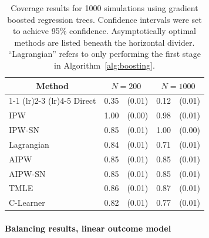 \begin{table}[H]
\centering
\small
\begin{tabular}{lrrrr}
\toprule
 \multicolumn{1}{c}{Method} & \multicolumn{2}{c}{$N=200$} & \multicolumn{2}{c}{$N=1000$} \\
 \cmidrule(lr){1-1}
\cmidrule(lr){2-3}
\cmidrule(lr){4-5}
  Direct & 0.35 & (0.01) & 0.12 & (0.01) \\ 
  IPW & 1.00 & (0.00) & 0.98 & (0.01) \\ 
  IPW-SN & 0.85 & (0.01) & 1.00 & (0.00) \\ 
Lagrangian & 0.84 & (0.01) & 0.71 & (0.01) \\ 
  \greymidrule
  AIPW & 0.85 & (0.01) & 0.85 & (0.01) \\ 
  AIPW-SN & 0.85 & (0.01) & 0.85 & (0.01) \\  
  TMLE & 0.86 & (0.01) & 0.87 & (0.01) \\ 
  C-Learner & 0.82 & (0.01) & 0.77 & (0.01) \\ 
\bottomrule
\end{tabular}
\caption{Coverage results for 1000 simulations using gradient boosted regression trees. Confidence intervals were set to achieve 95\% confidence. Asymptotically optimal methods are listed beneath the horizontal divider. ``Lagrangian'' refers to only performing the first stage in Algorithm~\ref{alg:boosting}.} %
\label{tb:coverage_ks_xgb}
\end{table}




















\paragraph{Balancing results, linear outcome model}

